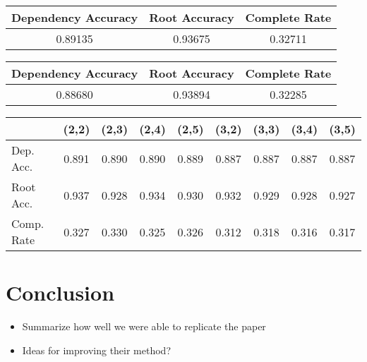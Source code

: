 \documentclass[12pt,fleqn]{article}
\begin{document}
    \begin{center}
        \begin{tabular}{|c|c|c|}
            \hline Dependency Accuracy & Root Accuracy & Complete Rate \\ \hline
            0.89135 & 0.93675 & 0.32711 \\ \hline
        \end{tabular}
    \end{center}

    \begin{center}
        \begin{tabular}{|c|c|c|}
            \hline Dependency Accuracy & Root Accuracy & Complete Rate \\ \hline
            0.88680 & 0.93894 & 0.32285 \\ \hline
        \end{tabular}
    \end{center}


    \begin{center}
        \begin{tabular}{|l|cccc|cccc|}
            \cline{2-9} \multicolumn{1}{c|}{} & (2,2) & (2,3) & (2,4) & (2,5) & (3,2) & (3,3) & (3,4) & (3,5) \\ \hline
            Dep. Acc. & 0.891 & 0.890 & 0.890 & 0.889 & 0.887 & 0.887 & 0.887 & 0.887 \\
            Root Acc. & 0.937 & 0.928 & 0.934 & 0.930 & 0.932 & 0.929 & 0.928 & 0.927 \\
            Comp. Rate & 0.327 & 0.330 & 0.325 & 0.326 & 0.312 & 0.318 & 0.316 & 0.317 \\ \hline
        \end{tabular}
    \end{center}


\section{Conclusion}
\begin{itemize}
\item Summarize how well we were able to replicate the paper
\item Ideas for improving their method?
\end{itemize}
\end{document}
